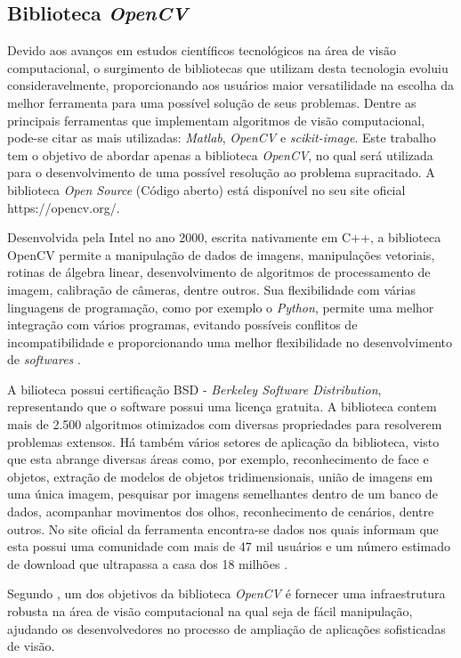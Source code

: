 \subsection{\textbf{Biblioteca \textit{OpenCV}}}

Devido aos avanços em estudos científicos tecnológicos na área de visão computacional, o surgimento de bibliotecas que utilizam desta tecnologia evoluiu consideravelmente, proporcionando aos usuários maior versatilidade na escolha da melhor ferramenta para uma possível solução de seus problemas. Dentre as principais ferramentas que implementam algoritmos de visão computacional, pode-se citar as mais utilizadas: \textit{Matlab}, \textit{OpenCV} e \textit{scikit-image}. Este trabalho tem o objetivo de abordar apenas a biblioteca \textit{OpenCV}, no qual será utilizada para o desenvolvimento de uma possível resolução ao problema supracitado. A biblioteca \textit{Open Source} (Código aberto) está disponível no seu site oficial https://opencv.org/.

Desenvolvida pela Intel no ano 2000, escrita nativamente em C++, a biblioteca OpenCV permite a manipulação de dados de imagens, manipulações vetoriais, rotinas de álgebra linear, desenvolvimento de algoritmos de processamento de imagem, calibração de câmeras, dentre outros. Sua flexibilidade com várias linguagens de programação, como por exemplo o \textit{Python}, permite uma melhor integração com vários programas, evitando possíveis conflitos de incompatibilidade e proporcionando uma melhor flexibilidade no desenvolvimento de \textit{softwares} \cite{BARBOZA2009}.

A bilioteca possui certificação BSD - \textit{Berkeley Software Distribution}, representando que o software possui uma licença gratuita. A biblioteca contem mais de 2.500 algoritmos otimizados com diversas propriedades para resolverem problemas extensos. Há também vários setores de aplicação da biblioteca, visto que esta abrange diversas áreas como, por exemplo, reconhecimento de face e objetos, extração de modelos de objetos tridimensionais, união de imagens em uma única imagem, pesquisar por imagens semelhantes dentro de um banco de dados, acompanhar movimentos dos olhos, reconhecimento de cenários, dentre outros. No site oficial da ferramenta encontra-se dados nos quais informam que esta possui uma comunidade com mais de 47 mil usuários e um número estimado de download que ultrapassa a casa dos 18 milhões \cite{CUNHA2013}.

Segundo , um dos objetivos da biblioteca \textit{OpenCV} é fornecer uma infraestrutura robusta na área de visão computacional na qual seja de fácil manipulação, ajudando os desenvolvedores no processo de ampliação de aplicações sofisticadas de visão.